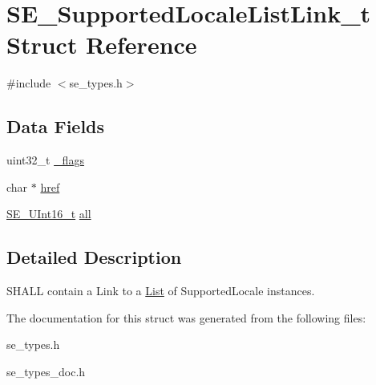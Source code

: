\hypertarget{structSE__SupportedLocaleListLink__t}{}\section{S\+E\+\_\+\+Supported\+Locale\+List\+Link\+\_\+t Struct Reference}
\label{structSE__SupportedLocaleListLink__t}


{\ttfamily \#include $<$se\+\_\+types.\+h$>$}

\subsection*{Data Fields}
\begin{DoxyCompactItemize}
\item 
uint32\+\_\+t \hyperlink{group__SupportedLocaleListLink_ga3834213a35449a295bdcda6fe2864998}{\+\_\+flags}
\item 
char $\ast$ \hyperlink{group__SupportedLocaleListLink_ga14a01b4c6119f255705a6f237cb8052b}{href}
\item 
\hyperlink{group__UInt16_gac68d541f189538bfd30cfaa712d20d29}{S\+E\+\_\+\+U\+Int16\+\_\+t} \hyperlink{group__SupportedLocaleListLink_gab0c9ec69f7f20c53bc6b52d30fde20f1}{all}
\end{DoxyCompactItemize}


\subsection{Detailed Description}
S\+H\+A\+LL contain a Link to a \hyperlink{structList}{List} of Supported\+Locale instances. 

The documentation for this struct was generated from the following files\+:\begin{DoxyCompactItemize}
\item 
se\+\_\+types.\+h\item 
se\+\_\+types\+\_\+doc.\+h\end{DoxyCompactItemize}
